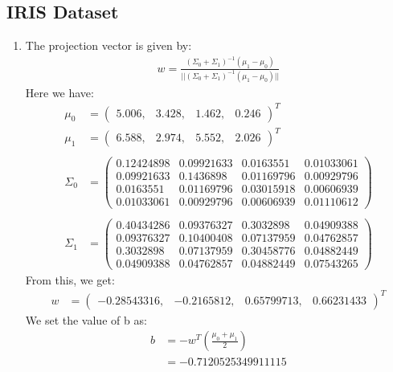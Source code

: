 \documentclass[12pt]{article}
\begin{document}
\subsection*{IRIS Dataset}
\begin{enumerate}[leftmargin=*]
    \item The projection vector is given by:
    \begin{align*}
        w = \frac{(\Sigma_0 + \Sigma_1)^{-1}(\mu_1 - \mu_0)}{||(\Sigma_0 + \Sigma_1)^{-1}(\mu_1 - \mu_0)||}
    \end{align*}
    Here we have:
    \begin{align*}
        \mu_0 &= \begin{pmatrix}
            5.006, & 3.428, & 1.462, & 0.246
        \end{pmatrix}^T \\
        \mu_1 &= \begin{pmatrix}
            6.588, & 2.974, & 5.552, & 2.026
        \end{pmatrix}^T \\ \\ 
        \Sigma_0 &= \begin{pmatrix}
            0.12424898 & 0.09921633 & 0.0163551 & 0.01033061 \\
            0.09921633 & 0.1436898 & 0.01169796 & 0.00929796 \\
            0.0163551 & 0.01169796 & 0.03015918 & 0.00606939 \\
            0.01033061 & 0.00929796 & 0.00606939 & 0.01110612
        \end{pmatrix} \\ \\
        \Sigma_1 &= \begin{pmatrix}
            0.40434286 & 0.09376327 & 0.3032898 & 0.04909388 \\
            0.09376327 & 0.10400408 & 0.07137959 & 0.04762857 \\
            0.3032898 & 0.07137959 & 0.30458776 & 0.04882449 \\
            0.04909388 & 0.04762857 & 0.04882449 & 0.07543265 
        \end{pmatrix}
    \end{align*}
    From this, we get:
    \begin{align*}
        w &= \begin{pmatrix}
            -0.28543316, & -0.2165812, & 0.65799713, & 0.66231433
        \end{pmatrix}^T
    \end{align*}
    We set the value of b as:
    \begin{align*}
        b &= -w^T(\frac{\mu_0 + \mu_1}{2}) \\
        &= -0.7120525349911115
    \end{align*}


\end{enumerate}
\end{document}
